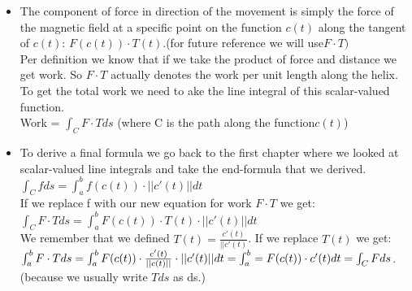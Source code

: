 \documentclass[12pt,a4paper]{article}
\begin{document}
\begin{itemize}
	\item  The component of force in direction of the movement is simply the force of the magnetic field at a specific point on the function $c(t)$ along the tangent of $c(t)$: $F(c(t))\cdot T(t)$.(for future reference we will use$F\cdot T)$ \\
	
	Per definition we know that if we take the product of force and distance we get work. So $F\cdot T$ actually denotes the work per unit length along the helix. \\
	To get the total work we need to ake the line integral of this scalar-valued function. \\
	Work = $\int_{C}^{} F\cdot T ds$ (where C is the path along the function$c(t)$)
	
	\item To derive a final formula we go back to the first chapter where we looked at scalar-valued line integrals and take the end-formula that we derived.\\
	$\int_{C}^{} f ds = \int_{a}^{b} f(c(t))\cdot ||c'(t)|| dt$\\
	If we replace f with our new equation for work $F\cdot T$ we get:\\
	
	$\int_{C}^{} F\cdot T ds = \int_{a}^{b}F(c(t))\cdot T(t)\cdot ||c'(t)|| dt$\\
	
	We remember that we defined $T(t) =  \frac{c'(t)}{||c'(t)}$. If we replace $T(t)$ we get: \\
	
	$\int_{a}^{b}F\cdot T ds = \int_{a}^{b} F(c(t))\cdot\frac{c'(t)}{||c(t)||}\cdot ||c'(t)|| dt \\= \int_{a}^{b} = F(c(t))\cdot c'(t) dt = \int_{C}^{}F ds$.\\
	(because we usually write $T ds$ as ds.)
	\end{itemize}
	\newpage
	
\end{document}
